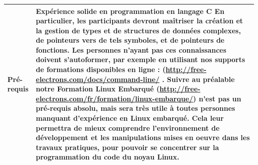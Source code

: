 \documentclass[a4paper,12pt,obeyspaces,spaces,hyphens]{article}
\begin{document}
{\begin{tabularx}{\textwidth}{|g|h|}
    {\bf Pré-requis} &

    {\bf Expérience solide en programmation en langage C}
    \newline En particulier, les participants devront maîtriser
    la création et la gestion de types et de structures de données
    complexes, de pointeurs vers de tels symboles, et de pointeurs de
    fonctions. \vspace{1em}
    \newline Les personnes n'ayant pas ces connaissances doivent
    s'autoformer, par exemple en utilisant nos supports de formations
    disponibles en ligne :
    \newline (\url{http://free-electrons.com/docs/command-line/} \vspace{1em}
    .
    \newline Suivre au préalable notre Formation Linux Embarqué
    \newline (\url{http://free-electrons.com/fr/formation/linux-embarque/})
    \newline n'est pas un pré-requis absolu, mais sera très utile à toutes
    personnes manquant d'expérience en Linux embarqué.
    Cela leur permettra de mieux comprendre l'environnement de
    développement et les manipulations mises en oeuvre dans les
    travaux pratiques, pour pouvoir se concentrer sur la programmation
    du code du noyau Linux.
    \\
    \hline
  \end{tabularx}

}
\end{document}
